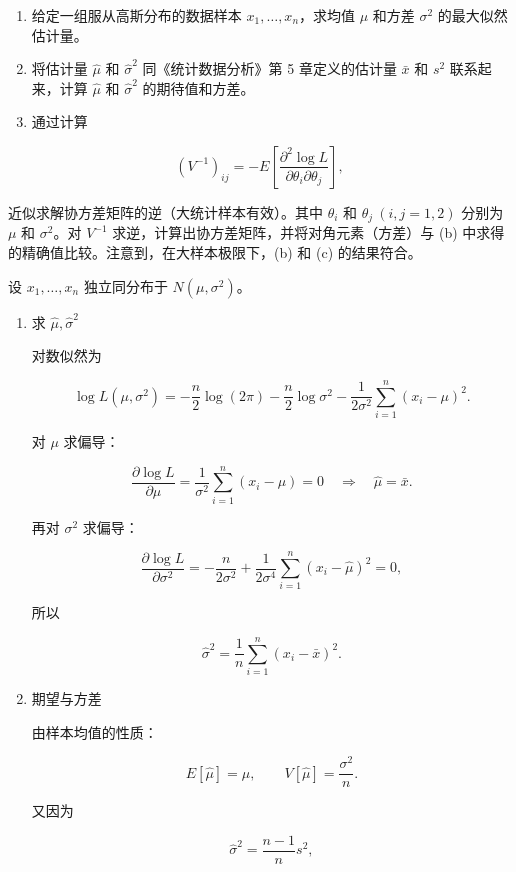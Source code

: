 ﻿


\begin{question}
\begin{enumerate}
\item
  给定一组服从高斯分布的数据样本 \(x_1,\ldots,x_n\)，求均值 \(\mu\)
  和方差 \(\sigma^2\) 的最大似然估计量。
\item
  将估计量 \(\hat\mu\) 和 \(\hat\sigma^2\) 同《统计数据分析》第 5
  章定义的估计量 \(\bar x\) 和 \(s^2\) 联系起来，计算 \(\hat\mu\) 和
  \(\hat\sigma^2\) 的期待值和方差。
\item
  通过计算
\end{enumerate}

\[
(V^{-1})_{ij}=-E\left[\frac{\partial^2\log L}{\partial\theta_i\partial\theta_j}\right],
\]

近似求解协方差矩阵的逆（大统计样本有效）。其中 \(\theta_i\) 和
\(\theta_j\ (i,j=1,2)\) 分别为 \(\mu\) 和 \(\sigma^2\)。对 \(V^{-1}\)
求逆，计算出协方差矩阵，并将对角元素（方差）与 (b)
中求得的精确值比较。注意到，在大样本极限下，(b) 和 (c) 的结果符合。
\begin{solution}
设 \(x_1,\dots,x_n\) 独立同分布于 \(N(\mu,\sigma^2)\)。

\begin{enumerate}
\item 求 \(\hat\mu,\hat\sigma^2\)

对数似然为

\[
\log L(\mu,\sigma^2)
=-\frac n2\log(2\pi)-\frac n2\log\sigma^2-
\frac1{2\sigma^2}\sum_{i=1}^n (x_i-\mu)^2.
\]

对 \(\mu\) 求偏导：

\[
\frac{\partial\log L}{\partial\mu}
=\frac1{\sigma^2}\sum_{i=1}^n(x_i-\mu)=0
\quad\Rightarrow\quad
\hat\mu=\bar x.
\]

再对 \(\sigma^2\) 求偏导：

\[
\frac{\partial\log L}{\partial\sigma^2}
=-\frac{n}{2\sigma^2}+\frac1{2\sigma^4}\sum_{i=1}^n(x_i-\hat\mu)^2=0,
\]

所以

\[
\hat\sigma^2=\frac1n\sum_{i=1}^n(x_i-\bar x)^2.
\]

\item 期望与方差

由样本均值的性质：

\[
E[\hat\mu]=\mu,\qquad V[\hat\mu]=\frac{\sigma^2}{n}.
\]

又因为

\[
\hat\sigma^2=\frac{n-1}{n}s^2,
\]


\end{enumerate}
\end{solution}
\end{question}
